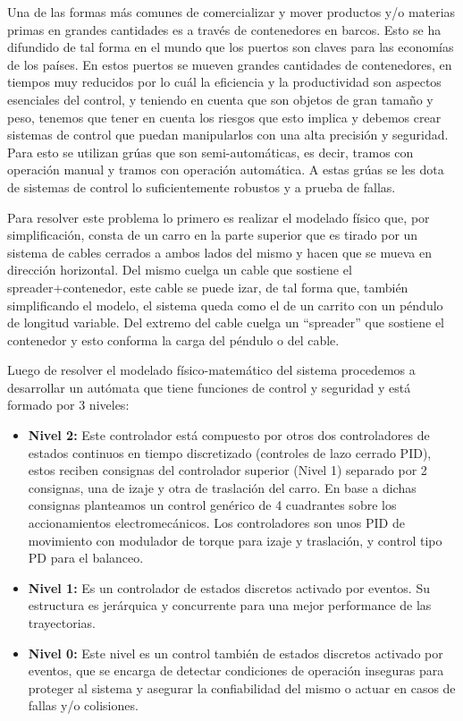 \documentclass[11pt]{article}
\begin{document}
Una de las formas más comunes de comercializar y mover productos y/o materias primas en grandes cantidades es a través de contenedores en barcos. Esto se ha difundido de tal forma en el mundo que los puertos son claves para las economías de los países. En estos puertos se mueven grandes cantidades de contenedores, en tiempos muy reducidos por lo cuál la eficiencia y la productividad son aspectos esenciales del control, y teniendo en cuenta que son objetos de gran tamaño y peso, tenemos que tener en cuenta los riesgos que esto implica y debemos crear sistemas de control que puedan manipularlos con una alta precisión y seguridad. Para esto se utilizan grúas que son semi-automáticas, es decir, tramos con operación manual y tramos con operación automática. A estas grúas se les dota de sistemas de control lo suficientemente robustos y a prueba de fallas.
\par
Para resolver este problema lo primero es realizar el modelado físico que, por simplificación, consta de un carro en la parte superior que es tirado por un sistema de cables cerrados a ambos lados del mismo y hacen que se mueva en dirección horizontal. Del mismo cuelga un cable que sostiene el spreader+contenedor, este cable se puede izar, de tal forma que, también simplificando el modelo, el sistema queda como el de un carrito con un péndulo de longitud variable. Del extremo del cable cuelga un ``spreader'' que sostiene el contenedor y esto conforma la carga del péndulo o del cable.
\par
Luego de resolver el modelado físico-matemático del sistema procedemos a desarrollar un autómata que tiene funciones de control y seguridad y está formado por 3 niveles:
\begin{itemize}
    \item \textbf{Nivel 2:} Este controlador está compuesto por otros dos controladores de estados continuos en tiempo discretizado (controles de lazo cerrado PID), estos reciben consignas del controlador superior (Nivel 1) separado por 2 consignas, una de izaje y otra de traslación del carro. En base a dichas consignas planteamos un control genérico de 4 cuadrantes sobre los accionamientos electromecánicos. Los controladores son unos PID de movimiento con modulador de torque para izaje y traslación, y control tipo PD para el balanceo.
    \item \textbf{Nivel 1:} Es un controlador de estados discretos activado por eventos. Su estructura es jerárquica y concurrente para una mejor performance de las trayectorias. 
    \item \textbf{Nivel 0:} Este nivel es un control también de estados discretos activado por eventos, que se encarga de detectar condiciones de operación inseguras para proteger al sistema y asegurar la confiabilidad del mismo o actuar en casos de fallas y/o colisiones.
\end{itemize}
\end{document}
